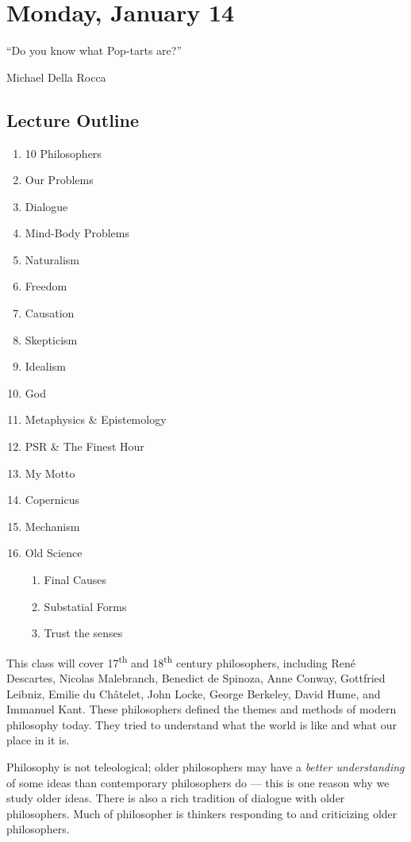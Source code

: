
\section{Monday, January 14}

\epigraph{``Do you know what Pop-tarts are?''}{Michael Della Rocca}

\subsection{Lecture Outline}
\begin{multicols}{2}
\begin{enumerate}
\item 10 Philosophers
\item Our Problems
\item Dialogue
\item Mind-Body Problems
\item Naturalism
\item Freedom
\item Causation
\item Skepticism
\item Idealism
\item God
\item Metaphysics \& Epistemology
\item PSR \& The Finest Hour
\item My Motto 
\item Copernicus
\item Mechanism
\item Old Science
\begin{enumerate}
\item Final Causes
\item Substatial Forms
\item Trust the senses
\end{enumerate}
\end{enumerate}
\end{multicols}

This class will cover 17\textsuperscript{th} and 18\textsuperscript{th} century philosophers, including René Descartes, Nicolas Malebranch, Benedict de Spinoza, Anne Conway, Gottfried Leibniz, Emilie du Châtelet, John Locke, George Berkeley, David Hume, and Immanuel Kant. These philosophers defined the themes and methods of modern philosophy today. They tried to understand what the world is like and what our place in it is.

Philosophy is not teleological; older philosophers may have a \emph{better understanding} of some ideas than contemporary philosophers do --- this is one reason why we study older ideas. There is also a rich tradition of dialogue with older philosophers. Much of philosopher is thinkers responding to and criticizing older philosophers.

